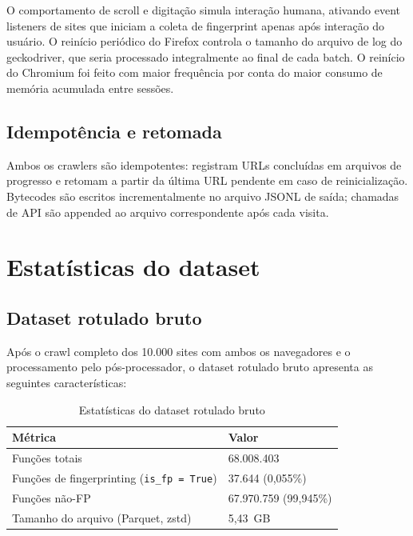 O comportamento de scroll e digitação simula interação humana, ativando
event listeners de sites que iniciam a coleta de fingerprint apenas
após interação do usuário. O reinício periódico do Firefox controla o tamanho do
arquivo de log do geckodriver, que seria processado integralmente ao final de cada
batch. O reinício do Chromium foi feito com maior frequência por conta do maior consumo de memória acumulada entre sessões.

\subsection{Idempotência e retomada}
\label{sub:idempotencia}

Ambos os crawlers são idempotentes: registram URLs concluídas em arquivos
de progresso e retomam a partir da última URL pendente em caso de
reinicialização. Bytecodes são escritos
incrementalmente no arquivo JSONL de saída; chamadas de API são appended ao
arquivo correspondente após cada visita.

\section{Estatísticas do dataset}
\label{sec:stats}

\subsection{Dataset rotulado bruto}
\label{sub:stats-bruto}

Após o crawl completo dos 10.000 sites com ambos os navegadores e o
processamento pelo pós-processador, o dataset rotulado bruto apresenta
as seguintes características:

\begin{table}[htb]
\centering
\caption{Estatísticas do dataset rotulado bruto}
\label{tab:stats-bruto}
\begin{tabular}{ll}
\toprule
\textbf{Métrica} & \textbf{Valor} \\
\midrule
Funções totais                                            & 68.008.403 \\
Funções de fingerprinting (\texttt{is\_fp = True})        & 37.644 (0,055\%) \\
Funções não-FP                                            & 67.970.759 (99,945\%) \\
Tamanho do arquivo (Parquet, zstd)                        & 5,43~GB \\
\bottomrule
\end{tabular}

\end{table}

